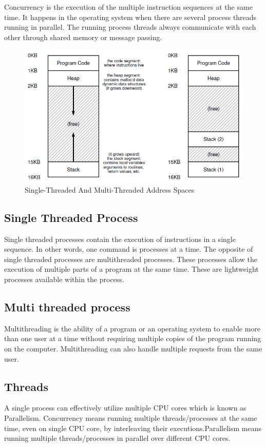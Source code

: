 \documentclass{article}
\begin{document}
Concurrency is the execution of the multiple instruction sequences at the same time. It happens in the operating system when there are several process threads running in parallel. The running process threads always communicate with each other through shared memory or message passing.
    \begin{figure}[ht]
     \centering
     \includegraphics[scale = 0.5]{img/Threaded.png}
     \caption{Single-Threaded And Multi-Threaded Address Spaces}
    \end{figure}
\subsection{Single Threaded Process}
Single threaded processes contain the execution of instructions in a single sequence. In other words, one command is processes at a time. The opposite of single threaded processes are multithreaded processes. These processes allow the execution of multiple parts of a program at the same time. These are lightweight processes available within the process.
\subsection{Multi threaded process}
Multithreading is the ability of a program or an operating system to enable more than one user at a time without requiring multiple copies of the program running on the computer. Multithreading can also handle multiple requests from the same user.
\subsection{Threads}
A single process can effectively utilize multiple CPU cores which is known as Parallelism. Concurrency means running multiple threads/processes at the same time, even on single CPU core, by interleaving their executions.Parallelism means running multiple threads/processes in parallel over different CPU cores.
\end{document}
